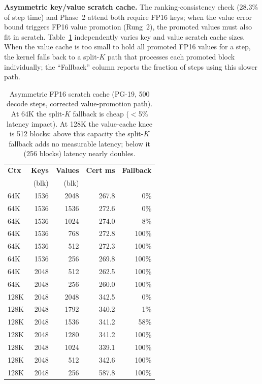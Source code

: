 \documentclass[11pt,a4paper]{article}
\theoremstyle{definition}
\theoremstyle{remark}
\begin{document}
\textbf{Asymmetric key/value scratch cache.}  The ranking-consistency check (28.3\% of step time) and Phase~2 attend both require FP16 keys; when the value error bound triggers FP16 value promotion (Rung~2), the promoted values must also fit in scratch.  Table~\ref{tab:asymmetric_cache} independently varies key and value scratch cache sizes.  When the value cache is too small to hold all promoted FP16 values for a step, the kernel falls back to a split-$K$ path that processes each promoted block individually; the ``Fallback'' column reports the fraction of steps using this slower path.

\begin{table}[H]
\centering
\caption{Asymmetric FP16 scratch cache (PG-19, 500 decode steps, corrected value-promotion path).  At 64K the split-$K$ fallback is cheap ($<$5\% latency impact).  At 128K the value-cache knee is 512 blocks: above this capacity the split-$K$ fallback adds no measurable latency; below it (256 blocks) latency nearly doubles.}
\label{tab:asymmetric_cache}
\small
\begin{tabular}{lrrrr}
\toprule
\textbf{Ctx} & \textbf{Keys} & \textbf{Values} & \textbf{Cert ms} & \textbf{Fallback} \\
 & (blk) & (blk) & & \\
\midrule
64K & 1536 & 2048 & 267.8 & 0\% \\
64K & 1536 & 1536 & 272.6 & 0\% \\
64K & 1536 & 1024 & 274.0 & 8\% \\
64K & 1536 & 768  & 272.8 & 100\% \\
64K & 1536 & 512  & 272.3 & 100\% \\
64K & 1536 & 256  & 269.8 & 100\% \\
64K & 2048 & 512  & 262.5 & 100\% \\
\rowcolor[gray]{0.92}
64K & 2048 & 256  & 260.0 & 100\% \\
\midrule
128K & 2048 & 2048 & 342.5 & 0\% \\
128K & 2048 & 1792 & 340.2 & 1\% \\
128K & 2048 & 1536 & 341.2 & 58\% \\
128K & 2048 & 1280 & 341.2 & 100\% \\
128K & 2048 & 1024 & 339.1 & 100\% \\
\rowcolor[gray]{0.92}
128K & 2048 & 512  & 342.6 & 100\% \\
128K & 2048 & 256  & 587.8 & 100\% \\
\bottomrule
\end{tabular}
\end{table}
\end{document}
